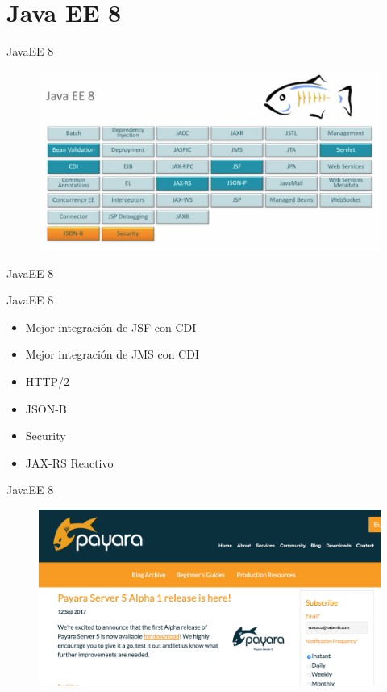 \documentclass{beamer}
\begin{document}
\section{Java EE 8}
\begin{frame}{JavaEE 8}
\begin{figure}
	\centering
	\includegraphics[width=0.9\linewidth]{Images/javaee8}
\end{figure}
\end{frame}


\begin{frame}{JavaEE 8}
\begin{alertblock}{JavaEE 8}
	\begin{itemize}
		\item Mejor integración de JSF con CDI
		\item Mejor integración de JMS con CDI
		\item HTTP/2
		\item JSON-B
		\item Security
		\item JAX-RS Reactivo
	\end{itemize}
\end{alertblock}
\end{frame}


\begin{frame}{JavaEE 8}
\begin{figure}
\centering
\includegraphics[width=\linewidth]{Images/payara5}
\end{figure}
\end{frame}
\end{document}
